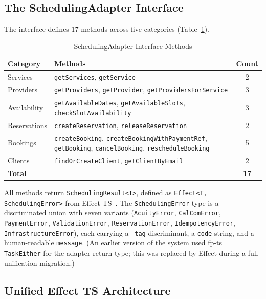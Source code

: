 \documentclass[conference]{IEEEtran}
\begin{document}
\subsection{The SchedulingAdapter Interface}

The interface defines 17 methods across five categories (Table~\ref{tab:interface}).

\begin{table}[htbp]
\caption{SchedulingAdapter Interface Methods}
\label{tab:interface}
\centering
\begin{tabular}{@{}llc@{}}
\toprule
\textbf{Category} & \textbf{Methods} & \textbf{Count} \\
\midrule
Services & \texttt{getServices}, \texttt{getService} & 2 \\
Providers & \texttt{getProviders}, \texttt{getProvider}, \texttt{getProvidersForService} & 3 \\
Availability & \texttt{getAvailableDates}, \texttt{getAvailableSlots}, \texttt{checkSlotAvailability} & 3 \\
Reservations & \texttt{createReservation}, \texttt{releaseReservation} & 2 \\
Bookings & \texttt{createBooking}, \texttt{createBookingWithPaymentRef}, \texttt{getBooking}, \texttt{cancelBooking}, \texttt{rescheduleBooking} & 5 \\
Clients & \texttt{findOrCreateClient}, \texttt{getClientByEmail} & 2 \\
\midrule
\textbf{Total} & & \textbf{17} \\
\bottomrule
\end{tabular}
\end{table}

All methods return \texttt{SchedulingResult<T>}, defined as \texttt{Effect<T, SchedulingError>} from Effect TS~\cite{effect-ts}. The \texttt{SchedulingError} type is a discriminated union with seven variants (\texttt{AcuityError}, \texttt{CalComError}, \texttt{PaymentError}, \texttt{ValidationError}, \texttt{ReservationError}, \texttt{IdempotencyError}, \texttt{InfrastructureError}), each carrying a \texttt{\_tag} discriminant, a \texttt{code} string, and a human-readable \texttt{message}. (An earlier version of the system used fp-ts~\cite{fp-ts} \texttt{TaskEither} for the adapter return type; this was replaced by Effect during a full unification migration.)

\subsection{Unified Effect TS Architecture}
\end{document}
